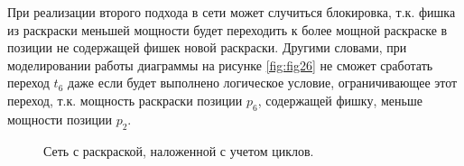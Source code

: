 При реализации второго подхода в сети может случиться блокировка, т.к. фишка из раскраски меньшей мощности будет переходить к более мощной раскраске в позиции не содержащей фишек новой раскраски. Другими словами, при моделировании работы диаграммы на рисунке \ref{fig:fig26} не сможет сработать переход $ t_{6} $ даже если будет выполнено логическое условие, ограничивающее этот переход, т.к. мощность раскраски позиции $ p_{6} $, содержащей фишку, меньше мощности позиции $ p_{2} $.

\begin{figure}
	\begin{minipage}[H]{0.49\linewidth}
		\caption{Сеть с раскраской, наложенной с учетом циклов.}
		\label{fig:fig25}
	\end{minipage}
	\hfill
	\begin{minipage}[H]{0.49\linewidth}

\end{minipage}
\end{figure}
